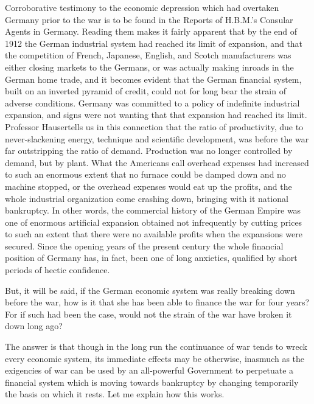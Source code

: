 \documentclass{book}
\begin{document}
Corroborative testimony to the economic depression which had overtaken Germany prior to the war is to be found in the Reports of H.B.M.’s Consular Agents in Germany. Reading them makes it fairly apparent that by the end of 1912 the German industrial system had reached its limit of expansion, and that the competition of French, Japanese, English, and Scotch manufacturers was either closing markets to the Germans, or was actually making inroads in the German home trade, and it becomes evident that the German financial system, built on an inverted pyramid of credit, could not for long bear the strain of adverse conditions. Germany was committed to a policy of indefinite industrial expansion, and signs were not wanting that that expansion had reached its limit. Professor Hauser\footnotemark[3] tells us in this connection that the ratio of productivity, due to never-slackening energy, technique and scientific development, was before the war far outstripping the ratio of demand. Production was no longer controlled by demand, but by plant. What the Americans call overhead expenses had increased to such an enormous extent that no furnace could be damped down and no machine stopped, or the overhead expenses would eat up the profits, and the whole industrial organization come crashing down, bringing with it national bankruptcy. In other words, the commercial history of the German Empire was one of enormous artificial expansion obtained not infrequently by cutting prices to such an extent that there were no available profits when the expansions were secured. Since the opening years of the present century the whole financial position of Germany has, in fact, been one of long anxieties, qualified by short periods of hectic confidence.

But, it will be said, if the German economic system was really breaking down before the war, how is it that she has been able to finance the war for four years? For if such had been the case, would not the strain of the war have broken it down long ago?

The answer is that though in the long run the continuance of war tends to wreck every economic system, its immediate effects may be otherwise, inasmuch as the exigencies of war can be used by an all-powerful Government to perpetuate a financial system which is moving towards bankruptcy by changing temporarily the basis on which it rests. Let me explain how this works.
\end{document}
